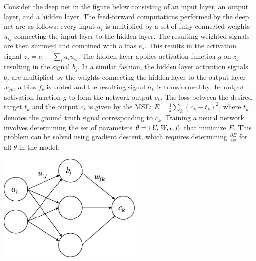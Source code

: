 


Consider the deep net in the figure below consisting of an input layer, an output layer, and a hidden layer. The feed-forward computations performed by the deep net are as follows: every input $a_{i}$ is multiplied by a set of fully-connected weights $u_{ij}$ connecting the input layer to the hidden layer. The resulting weighted signals are then summed and combined with a bias $e_{j}$. This results in the activation signal $z_{j}=e_{j}+\sum_{i}a_{i}u_{ij}$. The hidden layer applies activation function $g$ on $z_{j}$ resulting in the signal $b_{j}$.  In a similar fashion, the hidden layer activation signals $b_{j}$ are multiplied by the weights connecting the hidden layer to the output layer $w_{jk}$, a bias $f_{k}$ is added and the resulting signal $h_{k}$ is transformed by the output activation function $g$ to form the network output $c_{k}$. The loss between the desired target $t_{k}$ and the output $c_{k}$ is given by the MSE: $E= \frac{1}{2} \sum_{k} (c_{k}-t_{k})^{2}$, where $t_{k}$ denotes the ground truth signal corresponding to $c_{k}$. Training a neural network involves determining the set of parameters $\theta=\{\emph{U},\emph{W},\emph{e},\emph{f}\}$ that minimize $E$. This problem can be solved using gradient descent, which requires determining $\frac{\partial E}{\partial \theta}$ for all $\theta$ in the model.


\begin{center}
 \includegraphics[width=7cm]{fig/DeepNet.pdf}
 \end{center}

